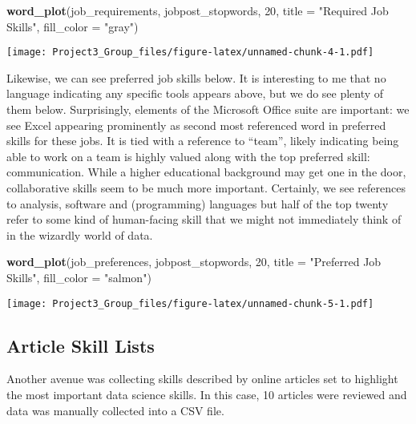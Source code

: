 \documentclass[]{article}
\newenvironment{Shaded}{\begin{snugshade}}{\end{snugshade}}
\newcommand{\DataTypeTok}[1]{\textcolor[rgb]{0.13,0.29,0.53}{#1}}
\newcommand{\DecValTok}[1]{\textcolor[rgb]{0.00,0.00,0.81}{#1}}
\newcommand{\KeywordTok}[1]{\textcolor[rgb]{0.13,0.29,0.53}{\textbf{#1}}}
\newcommand{\NormalTok}[1]{#1}
\newcommand{\StringTok}[1]{\textcolor[rgb]{0.31,0.60,0.02}{#1}}
\begin{document}
\begin{Shaded}
\begin{Highlighting}[]
\KeywordTok{word_plot}\NormalTok{(job_requirements, jobpost_stopwords, }\DecValTok{20}\NormalTok{, }\DataTypeTok{title =} \StringTok{"Required Job Skills"}\NormalTok{, }\DataTypeTok{fill_color =} \StringTok{"gray"}\NormalTok{)}
\end{Highlighting}
\end{Shaded}

\texttt{[image: Project3\_Group\_files/figure-latex/unnamed-chunk-4-1.pdf]}

Likewise, we can see preferred job skills below. It is interesting to me
that no language indicating any specific tools appears above, but we do
see plenty of them below. Surprisingly, elements of the Microsoft Office
suite are important: we see Excel appearing prominently as second most
referenced word in preferred skills for these jobs. It is tied with a
reference to ``team'', likely indicating being able to work on a team is
highly valued along with the top preferred skill: communication. While a
higher educational background may get one in the door, collaborative
skills seem to be much more important. Certainly, we see references to
analysis, software and (programming) languages but half of the top
twenty refer to some kind of human-facing skill that we might not
immediately think of in the wizardly world of data.

\begin{Shaded}
\begin{Highlighting}[]
\KeywordTok{word_plot}\NormalTok{(job_preferences, jobpost_stopwords, }\DecValTok{20}\NormalTok{, }\DataTypeTok{title =} \StringTok{"Preferred Job Skills"}\NormalTok{,}
          \DataTypeTok{fill_color =} \StringTok{"salmon"}\NormalTok{)}
\end{Highlighting}
\end{Shaded}

\texttt{[image: Project3\_Group\_files/figure-latex/unnamed-chunk-5-1.pdf]}

\hypertarget{article-skill-lists}{%
\subsection{Article Skill Lists}\label{article-skill-lists}}

Another avenue was collecting skills described by online articles set to
highlight the most important data science skills. In this case, 10
articles were reviewed and data was manually collected into a CSV file.
\end{document}
